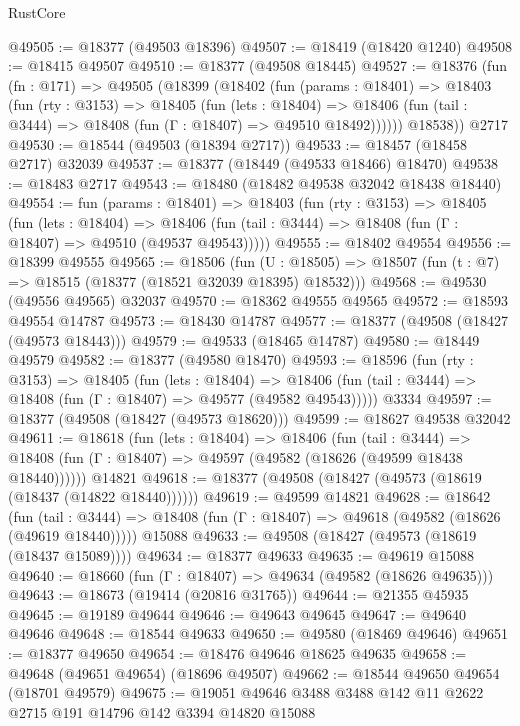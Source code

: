 \begin{lexlean}{RustCore}
\begin{coremodule}
@49505 := @18377 (@49503 @18396)
@49507 := @18419 (@18420 @1240)
@49508 := @18415 @49507
@49510 := @18377 (@49508 @18445)
@49527 := @18376
    (fun (fn : @171) =>
    @49505
      (@18399
        (@18402
          (fun (params : @18401) =>
          @18403
            (fun (rty : @3153) =>
            @18405
              (fun (lets : @18404) =>
              @18406 (fun (tail : @3444) => @18408 (fun (Γ : @18407) => @49510 @18492))))))
        @18538))
    @2717
@49530 := @18544 (@49503 (@18394 @2717))
@49533 := @18457 (@18458 @2717) @32039
@49537 := @18377 (@18449 (@49533 @18466) @18470)
@49538 := @18483 @2717
@49543 := @18480 (@18482 @49538 @32042 @18438 @18440)
@49554 := fun (params : @18401) =>
  @18403
    (fun (rty : @3153) =>
    @18405
      (fun (lets : @18404) =>
      @18406 (fun (tail : @3444) => @18408 (fun (Γ : @18407) => @49510 (@49537 @49543)))))
@49555 := @18402 @49554
@49556 := @18399 @49555
@49565 := @18506
    (fun (U : @18505) => @18507 (fun (t : @7) => @18515 (@18377 (@18521 @32039 @18395) @18532)))
@49568 := @49530 (@49556 @49565) @32037
@49570 := @18362 @49555 @49565
@49572 := @18593 @49554 @14787
@49573 := @18430 @14787
@49577 := @18377 (@49508 (@18427 (@49573 @18443)))
@49579 := @49533 (@18465 @14787)
@49580 := @18449 @49579
@49582 := @18377 (@49580 @18470)
@49593 := @18596
    (fun (rty : @3153) =>
    @18405
      (fun (lets : @18404) =>
      @18406 (fun (tail : @3444) => @18408 (fun (Γ : @18407) => @49577 (@49582 @49543)))))
    @3334
@49597 := @18377 (@49508 (@18427 (@49573 @18620)))
@49599 := @18627 @49538 @32042
@49611 := @18618
    (fun (lets : @18404) =>
    @18406
      (fun (tail : @3444) =>
      @18408 (fun (Γ : @18407) => @49597 (@49582 (@18626 (@49599 @18438 @18440))))))
    @14821
@49618 := @18377 (@49508 (@18427 (@49573 (@18619 (@18437 (@14822 @18440))))))
@49619 := @49599 @14821
@49628 := @18642
    (fun (tail : @3444) => @18408 (fun (Γ : @18407) => @49618 (@49582 (@18626 (@49619 @18440)))))
    @15088
@49633 := @49508 (@18427 (@49573 (@18619 (@18437 @15089))))
@49634 := @18377 @49633
@49635 := @49619 @15088
@49640 := @18660 (fun (Γ : @18407) => @49634 (@49582 (@18626 @49635)))
@49643 := @18673 (@19414 (@20816 @31765))
@49644 := @21355 @45935
@49645 := @19189 @49644
@49646 := @49643 @49645
@49647 := @49640 @49646
@49648 := @18544 @49633
@49650 := @49580 (@18469 @49646)
@49651 := @18377 @49650
@49654 := @18476 @49646 @18625 @49635
@49658 := @49648 (@49651 @49654) (@18696 @49507)
@49662 := @18544 @49650 @49654 (@18701 @49579)
@49675 := @19051 @49646 @3488 @3488 @142 @11 @2622 @2715 @191 @14796 @142 @3394 @14820 @15088

\end{coremodule}
\end{lexlean}
